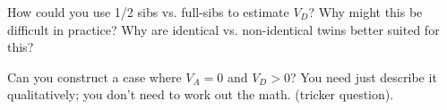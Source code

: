 \begin{question}
How could you use 1/2 sibs vs. full-sibs to estimate $V_D$? Why might
this be difficult in practice? Why are identical vs. non-identical
twins better suited for this? %
\end{question}

\begin{question}
Can you construct a case where $V_A=0$ and $V_D>0$? You need
just describe it qualitatively; you don't need to work out the
math. (tricker question). %
\end{question}


\newpage

